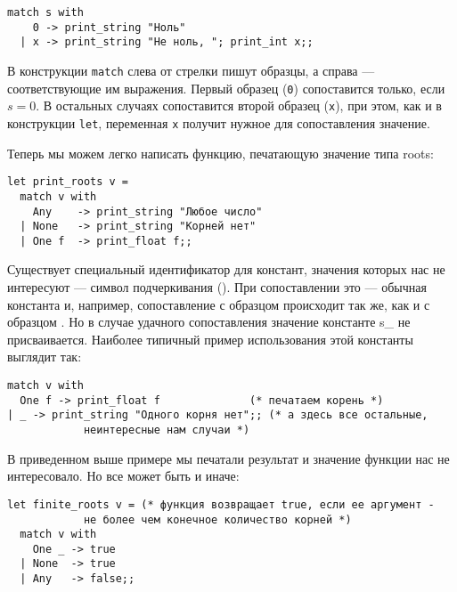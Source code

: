 \begin{verbatim}
match s with
    0 -> print_string "Ноль"
  | x -> print_string "Не ноль, "; print_int x;;
\end{verbatim}

В конструкции \verb!match! слева от стрелки пишут образцы, а справа --- соответствующие
им выражения.
Первый образец (\verb!0!) сопоставится только, если $s = 0$. 
В остальных случаях сопоставится второй образец (\verb!x!), при этом, как и в
конструкции \verb!let!, переменная \verb!x! получит нужное для сопоставления значение.

Теперь мы можем легко написать функцию, печатающую значение типа roots:

\begin{verbatim}
let print_roots v =
  match v with
    Any    -> print_string "Любое число"
  | None   -> print_string "Корней нет"
  | One f  -> print_float f;;
\end{verbatim}

Существует специальный идентификатор для констант, значения которых нас не 
интересуют --- символ подчеркивания (\s{\_}). При сопоставлении это --- 
обычная константа и, например, сопоставление с образцом  
происходит так же, как и с образцом . Но в случае удачного 
сопоставления значение константе s{\_} не присваивается. Наиболее типичный 
пример использования этой константы выглядит так:

\begin{verbatim}
match v with
  One f -> print_float f              (* печатаем корень *)
| _ -> print_string "Одного корня нет";; (* а здесь все остальные, 
			неинтересные нам случаи *)
\end{verbatim}

В приведенном выше примере мы печатали результат и значение функции нас
не интересовало. Но все может быть и иначе:

\begin{verbatim}
let finite_roots v = (* функция возвращает true, если ее аргумент -
			не более чем конечное количество корней *)
  match v with
    One _ -> true
  | None  -> true
  | Any   -> false;;
\end{verbatim}

